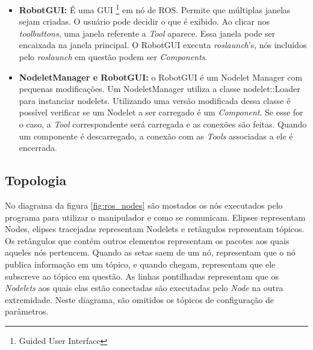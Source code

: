 \begin{itemize}
\item \textbf{RobotGUI:} É uma GUI \footnote{Guided User Interface} em nó de ROS. Permite que múltiplas janelas sejam criadas. O usuário pode decidir o que é exibido. Ao clicar nos \textit{toolbuttons}, uma janela referente a \textit{Tool} aparece. Essa janela pode ser encaixada na janela principal. O RobotGUI executa \textit{roslaunch}'s, nós incluídos pelo \textit{roslaunch} em questão podem ser \textit{Components}. 

\item \textbf{NodeletManager e RobotGUI:} o RobotGUI é um Nodelet Manager com pequenas modificações. Um NodeletManager utiliza a classe nodelet::Loader para instanciar nodelets. Utilizando uma versão modificada dessa classe é possível verificar se um Nodelet a ser carregado é um \textit{Component}. Se esse for o caso, a \textit{Tool} correspondente será carregada e as conexões são feitas. Quando um componente é descarregado, a conexão com as \textit{Tools} associadas a ele é encerrada.
\end{itemize}



\subsection{Topologia}

No diagrama da figura \ref{fig:ros_nodes} são mostados os nós executados pelo programa para utilizar o manipulador e como se comunicam. Elipses representam Nodes, elipses tracejadas representam Nodelets e retângulos representam tópicos. Os retângulos que contém outros elementos representam os pacotes aos quais aqueles nós pertencem. Quando as setas saem de um nó, representam que o nó publica informação em um tópico, e quando chegam, representam que ele subscreve ao tópico em questão. As linhas pontilhadas representam que os \textit{Nodelets} aos quais elas estão conectadas são executadas pelo \textit{Node} na outra extremidade. Neste diagrama, são omitidos os tópicos de configuração de parâmetros.

